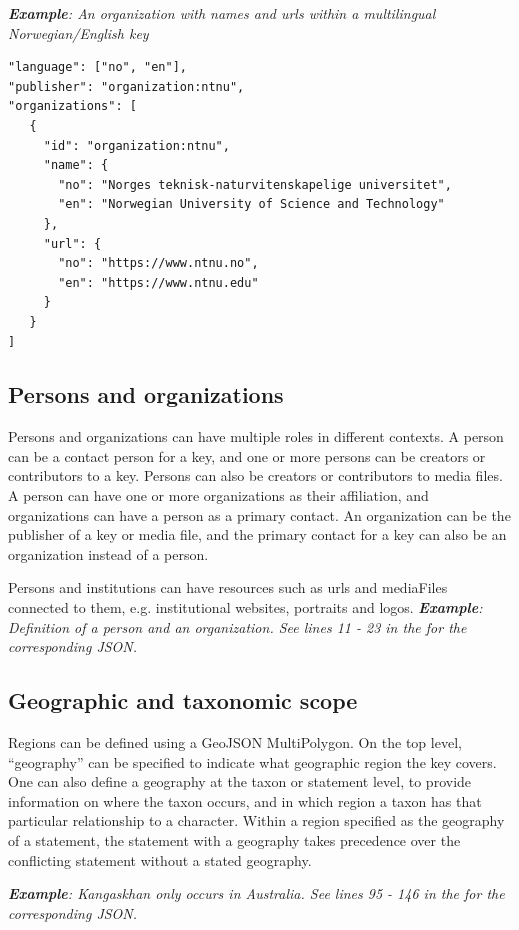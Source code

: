 \documentclass[10pt,letterpaper]{article}
\begin{document}
\textit{\textbf{Example}: An organization with names and urls within a multilingual Norwegian/English key}

\begin{verbatim}
"language": ["no", "en"],
"publisher": "organization:ntnu",
"organizations": [
   {
     "id": "organization:ntnu",
     "name": {
       "no": "Norges teknisk-naturvitenskapelige universitet",
       "en": "Norwegian University of Science and Technology"
     },
     "url": {
       "no": "https://www.ntnu.no",
       "en": "https://www.ntnu.edu"
     }
   }
]

\end{verbatim}
\subsection*{
Persons and organizations
}
Persons and organizations can have multiple roles in different contexts. A person can be a contact person for a key, and one or more persons can be creators or contributors to a key. Persons can also be creators or contributors to media files. A person can have one or more organizations as their affiliation, and organizations can have a person as a primary contact. An organization can be the publisher of a key or media file, and the primary contact for a key can also be an organization instead of a person.

Persons and institutions can have resources such as urls and mediaFiles connected to them, e.g. institutional websites, portraits and logos.
\textit{\textbf{Example}: Definition of a person and an organization. See lines 11 - 23 in the  for the corresponding JSON.}
\subsection*{
Geographic and taxonomic scope
}
Regions can be defined using a GeoJSON MultiPolygon. On the top level, ``geography'' can be specified to indicate what geographic region the key covers. One can also define a geography at the taxon or statement level, to provide information on where the taxon occurs, and in which region a taxon has that particular relationship to a character. Within a region specified as the geography of a statement, the statement with a geography takes precedence over the conflicting statement without a stated geography.

\textit{\textbf{Example}: Kangaskhan only occurs in Australia. See lines 95 - 146 in the  for the corresponding JSON.}
\end{document}

